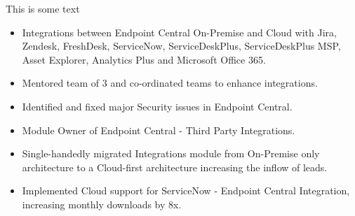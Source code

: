 \documentclass[10pt,a4paper,ragged2e]{altacv}
\begin{document}


\begin{fullwidth}
\makecvheader
\color{body!30}\hdashrule{\linewidth}{0.6pt}{0.5ex}\par \color{body}
\smallskip
{}
This is some text 
\end{fullwidth}



\begin{itemize}
\item Integrations between Endpoint Central On-Premise and Cloud with Jira, Zendesk, FreshDesk, ServiceNow, ServiceDeskPlus, ServiceDeskPlus MSP, Asset Explorer, Analytics Plus and Microsoft Office 365.
\smallskip
\item Mentored team of 3 and co-ordinated teams to enhance integrations.
\smallskip
\item Identified and fixed major Security issues in Endpoint Central.
\smallskip
\item Module Owner of Endpoint Central - Third Party Integrations.
\smallskip
\item Single-handedly migrated Integrations module from On-Premise only architecture to a Cloud-first architecture increasing the inflow of leads.
\smallskip
\item Implemented Cloud support for ServiceNow - Endpoint Central Integration, increasing monthly downloads by 8x.
\end{itemize}
\end{document}
